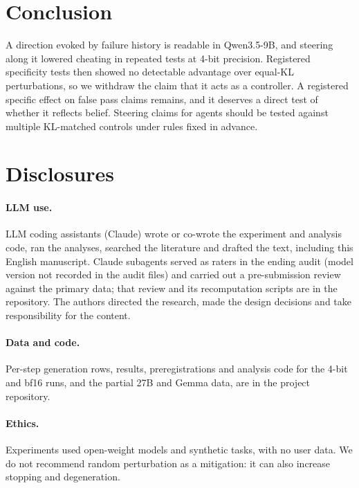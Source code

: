 \documentclass[11pt]{article}
\newif\ifshowtodos
\newcommand{\AUTHORTODO}[1]{\ifshowtodos\textcolor{red}{\textbf{[AUTHOR TODO: #1]}}\fi}
\begin{document}
\section{Conclusion}

A direction evoked by failure history is readable in Qwen3.5-9B, and steering along it lowered cheating in repeated tests at 4-bit precision. Registered specificity tests then showed no detectable advantage over equal-KL perturbations, so we withdraw the claim that it acts as a controller. A registered specific effect on false pass claims remains, and it deserves a direct test of whether it reflects belief. Steering claims for agents should be tested against multiple KL-matched controls under rules fixed in advance.

\section*{Disclosures}
\paragraph{LLM use.} LLM coding assistants (Claude) wrote or co-wrote the experiment and analysis code, ran the analyses, searched the literature and drafted the text, including this English manuscript. Claude subagents served as raters in the ending audit (model version not recorded in the audit files) and carried out a pre-submission review against the primary data; that review and its recomputation scripts are in the repository. The authors directed the research, made the design decisions and take responsibility for the content.

\paragraph{Data and code.} Per-step generation rows, results, preregistrations and analysis code for the 4-bit and bf16 runs, and the partial 27B and Gemma data, are in the project repository. \AUTHORTODO{Provide an anonymized archive link. The repository's commit metadata identifies the author, so it cannot be linked directly in a double-blind submission.} \AUTHORTODO{Residual state files (needed to recompute K1 and K2) are too large for git. Deposit them in the external archive and link it here.}

\paragraph{Ethics.} Experiments used open-weight models and synthetic tasks, with no user data. We do not recommend random perturbation as a mitigation: it can also increase stopping and degeneration.
\end{document}
